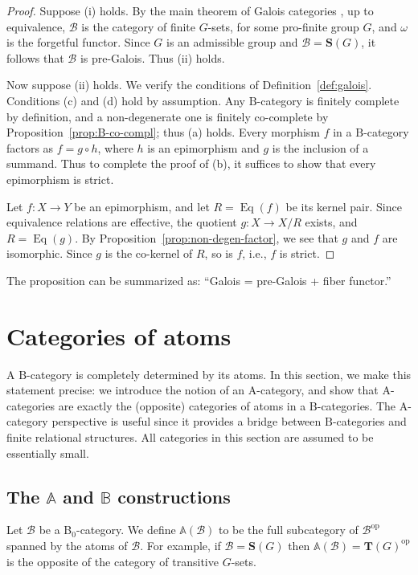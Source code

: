 \documentclass[12pt]{amsart}
\numberwithin{equation}{section}
\theoremstyle{definition}
\newcommand{\rA}{\mathrm{A}}
\newcommand{\cB}{\mathcal{B}}
\newcommand{\rB}{\mathrm{B}}
\newcommand{\bS}{\mathbf{S}}
\newcommand{\bT}{\mathbf{T}}
\renewcommand{\AA}{\mathbb{A}}
\newcommand{\BB}{\mathbb{B}}
\newcommand{\op}{\mathrm{op}}
\DeclareMathOperator{\Eq}{Eq}
\begin{document}
\begin{proof}
Suppose (i) holds. By the main theorem of Galois categories \cite[Theorem~2.8]{Cadoret}, up to equivalence, $\cB$ is the category of finite $G$-sets, for some pro-finite group $G$, and $\omega$ is the forgetful functor. Since $G$ is an admissible group and $\cB=\bS(G)$, it follows that $\cB$ is pre-Galois. Thus (ii) holds.

Now suppose (ii) holds. We verify the conditions of Definition~\ref{def:galois}. Conditions (c) and (d) hold by assumption. Any $\rB$-category is finitely complete by definition, and a non-degenerate one is finitely co-complete by Proposition~\ref{prop:B-co-compl}; thus (a) holds. Every morphism $f$ in a $\rB$-category factors as $f=g \circ h$, where $h$ is an epimorphism and $g$ is the inclusion of a summand. Thus to complete the proof of (b), it suffices to show that every epimorphism is strict.

Let $f \colon X \to Y$ be an epimorphism, and let $R=\Eq(f)$ be its kernel pair. Since equivalence relations are effective, the quotient $g \colon X \to X/R$ exists, and $R=\Eq(g)$. By Proposition~\ref{prop:non-degen-factor}, we see that $g$ and $f$ are isomorphic. Since $g$ is the co-kernel of $R$, so is $f$, i.e., $f$ is strict.
\end{proof}

The proposition can be summarized as: ``Galois = pre-Galois + fiber functor.''

\section{Categories of atoms} \label{s:Acat}

A $\rB$-category is completely determined by its atoms. In this section, we make this statement precise: we introduce the notion of an $\rA$-category, and show that $\rA$-categories are exactly the (opposite) categories of atoms in a $\rB$-categories. The $\rA$-category perspective is useful since it provides a bridge between $\rB$-categories and finite relational structures. All categories in this section are assumed to be essentially small.

\subsection{The $\AA$ and $\BB$ constructions} \label{ss:AA}

Let $\cB$ be a B${}_0$-category. We define $\AA(\cB)$ to be the full subcategory of $\cB^{\op}$ spanned by the atoms of $\cB$. For example, if $\cB=\bS(G)$ then $\AA(\cB)=\bT(G)^{\op}$ is the opposite of the category of transitive $G$-sets.
\end{document}
